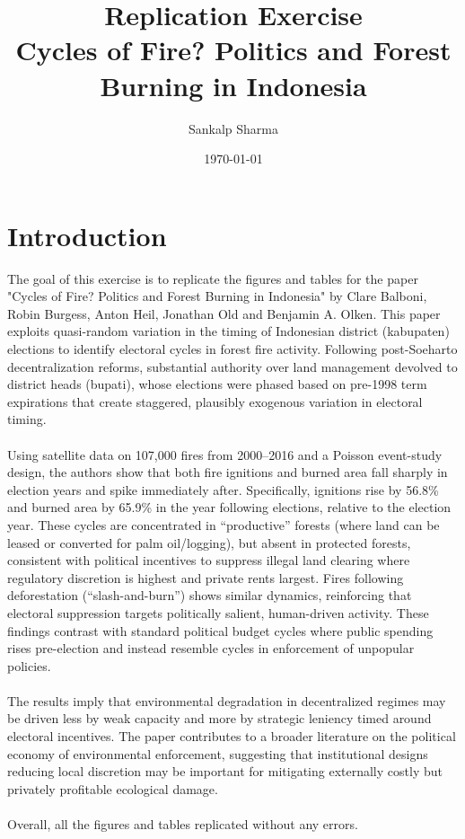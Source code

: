 \documentclass[11pt,a4paper]{article}
\begin{document}
\title{Replication Exercise  \\ 
Cycles of Fire? Politics and Forest Burning in Indonesia}

\author{Sankalp Sharma}
\date{\today}

\maketitle

\section{Introduction}

The goal of this exercise is to replicate the figures and tables for the paper "Cycles of Fire? Politics and Forest Burning in Indonesia" by Clare Balboni, Robin Burgess, Anton Heil, Jonathan Old and Benjamin A. Olken. This paper exploits quasi-random variation in the timing of Indonesian district (kabupaten) elections to identify electoral cycles in forest fire activity. Following post-Soeharto decentralization reforms, substantial authority over land management devolved to district heads (bupati), whose elections were phased based on pre-1998 term expirations that create staggered, plausibly exogenous variation in electoral timing. 
\\
\\
Using satellite data on 107,000 fires from 2000–2016 and a Poisson event-study design, the authors show that both fire ignitions and burned area fall sharply in election years and spike immediately after. Specifically, ignitions rise by 56.8\% and burned area by 65.9\% in the year following elections, relative to the election year. These cycles are concentrated in “productive” forests (where land can be leased or converted for palm oil/logging), but absent in protected forests, consistent with political incentives to suppress illegal land clearing where regulatory discretion is highest and private rents largest. Fires following deforestation (“slash-and-burn”) shows similar dynamics, reinforcing that electoral suppression targets politically salient, human-driven activity. These findings contrast with standard political budget cycles where public spending rises pre-election and instead resemble cycles in enforcement of unpopular policies. 
\\
\\
The results imply that environmental degradation in decentralized regimes may be driven less by weak capacity and more by strategic leniency timed around electoral incentives. The paper contributes to a broader literature on the political economy of environmental enforcement, suggesting that institutional designs reducing local discretion may be important for mitigating externally costly but privately profitable ecological damage.
\\
\\
Overall, all the figures and tables replicated without any errors. 
\end{document}
